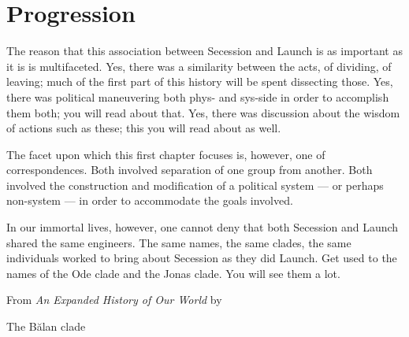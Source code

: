 \documentclass[10pt]{memoir}
\begin{document}
  \part{Progression}
  The reason that this association between Secession and Launch is as important as it is is multifaceted. Yes, there was a similarity between the acts, of dividing, of leaving; much of the first part of this history will be spent dissecting those. Yes, there was political maneuvering both phys- and sys-side in order to accomplish them both; you will read about that. Yes, there was discussion about the wisdom of actions such as these; this you will read about as well.

  The facet upon which this first chapter focuses is, however, one of correspondences. Both involved separation of one group from another. Both involved the construction and modification of a political system — or perhaps non-system — in order to accommodate the goals involved.

  In our immortal lives, however, one cannot deny that both Secession and Launch shared the same engineers. The same names, the same clades, the same individuals worked to bring about Secession as they did Launch. Get used to the names of the Ode clade and the Jonas clade. You will see them a lot.

  \vspace{1em}

  From \emph{An Expanded History of Our World} by

  The Bălan clade
  
  \vfill

  
  
  
  
  
  
  
  
  
  
  
  
  
  
  
  
  
  
\end{document}
